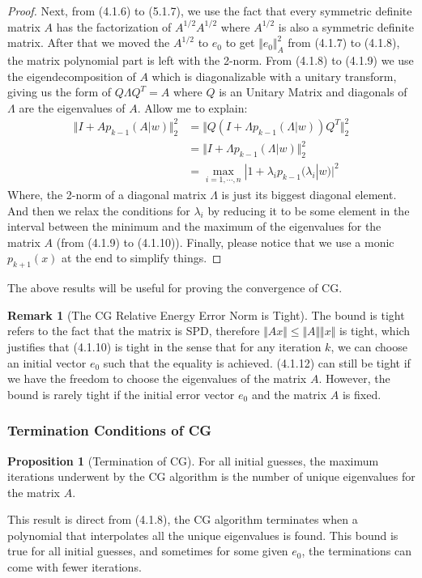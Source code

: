 \documentclass[]{article}
\theoremstyle{definition}
\newtheorem{prop}{Proposition}[section]  %
\newtheorem{remark}{Remark}[subsection]  %
\begin{document}
\begin{proof}
            \par
            Next, from (4.1.6) to (5.1.7), we use the fact that every symmetric definite matrix $A$ has the factorization of $A^{1/2}A^{1/2}$ where $A^{1/2}$ is also a symmetric definite matrix. After that we moved the $A^{1/2}$ to $e_0$ to get $\Vert e_0\Vert_A^2$ from (4.1.7) to (4.1.8), the matrix polynomial part is left with the 2-norm. From (4.1.8) to (4.1.9) we use the eigendecomposition of $A$ which is diagonalizable with a unitary transform, giving us the form of $Q\Lambda Q^T = A$ where $Q$ is an Unitary Matrix and diagonals of $\Lambda$ are the eigenvalues of $A$. Allow me to explain: 
            \begin{align}
                \Vert I + Ap_{k - 1}(A|w)\Vert_2^2
                &= \Vert Q(I + \Lambda p_{k - 1}(\Lambda|w))Q^T\Vert_2^2
                \\
                &= \Vert I + \Lambda p_{k - 1}(\Lambda|w)\Vert_2^2
                \\
                &= \max_{i=1,\cdots, n}|1 + \lambda_ip_{k - 1}(\lambda_i|w)|^2
            \end{align}
            Where, the 2-norm of a diagonal matrix $\Lambda$ is just its biggest diagonal element. And then we relax the conditions for $\lambda_i$ by reducing it to be some element in the interval between the minimum and the maximum of the eigenvalues for the matrix $A$ (from (4.1.9) to (4.1.10)). Finally, please notice that we use a monic $p_{k+1}(x)$ at the end to simplify things. 
        \end{proof}
        The above results will be useful for proving the convergence of CG. 
        \begin{remark}[The CG Relative Energy Error Norm is Tight]
            The bound is tight refers to the fact that the matrix is SPD, therefore $\Vert Ax\Vert \le \Vert A\Vert\Vert x\Vert$ is tight, which justifies that (4.1.10) is tight in the sense that for any iteration $k$, we can choose an initial vector $e_0$ such that the equality is achieved. (4.1.12) can still be tight if we have the freedom to choose the eigenvalues of the matrix $A$. However, the bound is rarely tight if the initial error vector $e_0$ and the matrix $A$ is fixed. 
        \end{remark}
        \subsubsection{Termination Conditions of CG}
            \begin{prop}[Termination of CG]\label{prop:Termination_of_CG}
                For all initial guesses, the maximum iterations underwent by the CG algorithm is the number of unique eigenvalues for the matrix $A$. 
            \end{prop}
            This result is direct from (4.1.8), the CG algorithm terminates when a polynomial that interpolates all the unique eigenvalues is found. This bound is true for all initial guesses, and sometimes for some given $e_0$, the terminations can come with fewer iterations. 
\end{document}
